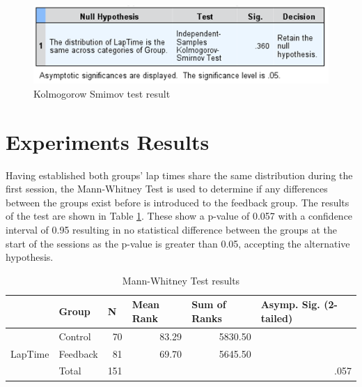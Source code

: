\begin{figure}[!htb]
	\centering
	\includegraphics[width=\textwidth]{images/KolmogorowSmimov.png}
	\caption[Kolmogorow Smimov Test]{Kolmogorow Smimov test result}
	\label{fig:chart-KolmogorowSmimov}
\end{figure}

\section{Experiments Results}
\label{sec:eval-ExperimentsResults}
Having established both groups' lap times share the same distribution during the first session, the Mann-Whitney Test is used to determine if any differences between the groups exist before \methodname is introduced to the feedback group. The results of the test are shown in Table \ref{table:Mann-Whitney}. These show a p-value of 0.057 with a confidence interval of 0.95 resulting in no statistical difference between the groups at the start of the sessions as the p-value is greater than 0.05, accepting the alternative hypothesis.

\begin{table}[!htb]
	\centering
	\begin{tabular}{|ll|r|rr|r|}
		\hline
		& Group    & \multicolumn{1}{l|}{N} & \multicolumn{1}{l|}{Mean Rank} & \multicolumn{1}{l|}{Sum of Ranks} & \multicolumn{1}{l|}{Asymp. Sig. (2-tailed)} \\ \hline
		\multicolumn{1}{|l|}{\multirow{3}{*}{LapTime}} & Control  & 70                     & \multicolumn{1}{r|}{83.29}     & 5830.50                           &                                             \\ \cline{2-5}
		\multicolumn{1}{|l|}{}                         & Feedback & 81                     & \multicolumn{1}{r|}{69.70}     & 5645.50                           &                                             \\ \cline{2-5}
		\multicolumn{1}{|l|}{}                         & Total    & 151                    &                                &                                   & .057                                        \\ \hline
	\end{tabular}
	\caption[Mann-Whitney Test results]{Mann-Whitney Test results}
	\label{table:Mann-Whitney}
\end{table}


